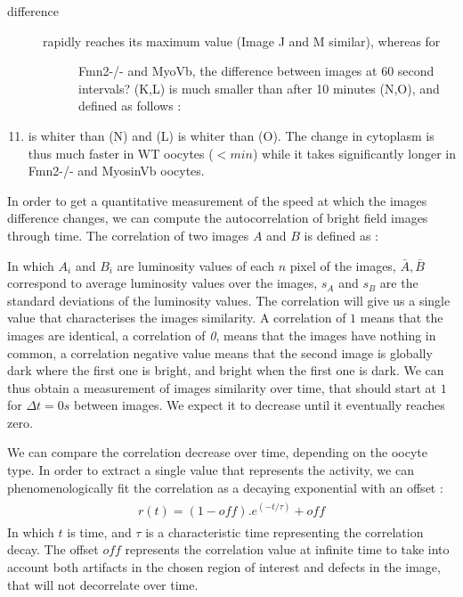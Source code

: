 \documentclass[A4paperpaper,11pt,english]{sphinxmanual}
\begin{document}
\begin{description}
\item[{difference}] \leavevmode\begin{description}
\item[{rapidly reaches its maximum value (Image J and M similar), whereas for}] \leavevmode
Fmn2-/- and MyoVb, the difference between images at 60 second intervals?
(K,L) is much smaller than after 10 minutes (N,O), and defined as follows :

\end{description}

\end{description}
\begin{enumerate}
\setcounter{enumi}{10}
\item {} 
is whiter than (N) and (L) is whiter than (O). The change in cytoplasm
is thus much faster in WT oocytes (\(< min\)) while it takes
significantly longer in Fmn2-/- and MyosinVb oocytes.

\end{enumerate}

In order to get a quantitative measurement of the speed at which the images difference changes, we can compute the autocorrelation of bright field images
through time. The correlation of two images \(A\) and \(B\) is defined as :

In which \(A_i\) and \(B_i\) are luminosity values of each
\(n\) pixel of the images,  \(\bar{A},\bar{B}\) correspond to average
luminosity values over the images, \(s_A\) and \(s_B\) are the standard
deviations of the luminosity values. The correlation will give us a single
value that characterises the images similarity. A correlation of
\(1\) means that the images are identical, a correlation of \emph{0}, means that the
images have nothing in common, a correlation negative value means that the
second image is globally dark where the first one is bright, and bright when the
first one is dark. We can thus obtain a measurement of images similarity
over time, that should start at \(1\) for \(\Delta t=0s\) between
images. We expect it to decrease until it eventually reaches zero.

We can compare the correlation decrease over time, depending on the oocyte type. In order to extract a single value that represents the activity, we can
phenomenologically fit the correlation as a decaying exponential with an offset
:
\label{parts/part5:equation-edecay}\begin{gather}
\begin{split}r(t) = (1-off).e^{(-t/\tau)}+off\end{split}\label{parts/part5-edecay}
\end{gather}
In which \(t\) is time, and \(\tau\) is a characteristic time
representing the correlation decay. The offset  \(off\) represents the  correlation value
at infinite time to take into account both artifacts in the chosen
region of interest and defects in the image, that will not decorrelate over
time.
\end{document}
